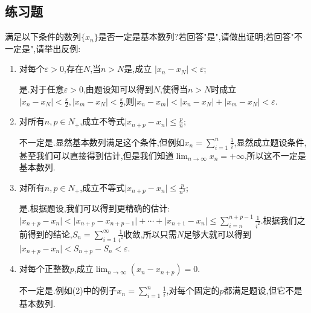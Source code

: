 \documentclass[cn,chinese]{elegantbook}
\begin{document}
            \subsection{练习题}
            \begin{exercise}
                满足以下条件的数列$\{x_n\}$是否一定是基本数列?若回答"是",请做出证明;若回答"不一定是",请举出反例:
                \begin{enumerate}
                    \item 对每个$\varepsilon>0$,存在$N$,当$n>N$是,成立
                    $\lvert x_n-x_N\rvert<\varepsilon$;
                    \begin{solution}
                        是.对于任意$\varepsilon>0$,由题设知可以得到$N$,使得当$n>N$时成立$\lvert x_n-x_N\rvert<\frac{\varepsilon}{2},\lvert x_m-x_N\rvert<\frac{\varepsilon}{2}$,则$\lvert x_n-x_m\rvert<\lvert x_n-x_N\rvert+\lvert x_m-x_N\rvert<\varepsilon$.
                    \end{solution}
                    \item 对所有$n,p\in N_+$,成立不等式$\lvert x_{n+p}-x_n\rvert\leqslant\frac{p}{n}$;
                    \begin{solution}
                        不一定是.显然基本数列满足这个条件,但例如$x_n=\sum_{i=1}^{n}\frac{1}{i}$,显然成立题设条件,甚至我们可以直接得到估计,但是我们知道$\lim_{n\to\infty}x_n=+\infty$,所以这不一定是基本数列.
                    \end{solution}
                    \item 对所有$n,p\in N_+$,成立不等式$\lvert x_{n+p}-x_n\rvert\leqslant\frac{p}{n^2}$;
                    \begin{solution}
                        是.根据题设,我们可以得到更精确的估计:$\lvert x_{n+p}-x_n\rvert<\lvert x_{n+p}-x_{n+p-1}\rvert+\cdots+\lvert x_{n+1}-x_{n}\rvert\leqslant\sum_{i=n}^{n+p-1}\frac{1}{i^2}$.根据我们之前得到的结论,$S_n=\sum_{i=1}^{\infty}\frac{1}{i^2}$收敛,所以只需$N$足够大就可以得到$\lvert x_{n+p}-x_n\rvert<S_{n+p}-S_n<\varepsilon$.
                    \end{solution}
                    \item 对每个正整数$p$,成立$\lim_{n\to\infty}(x_n-x_{n+p})=0$.
                    \begin{solution}
                        不一定是.例如(2)中的例子$x_n=\sum_{i=1}^{n}\frac{1}{i}$,对每个固定的$p$都满足题设,但它不是基本数列.
                    \end{solution}
                \end{enumerate}
            \end{exercise}
\end{document}
